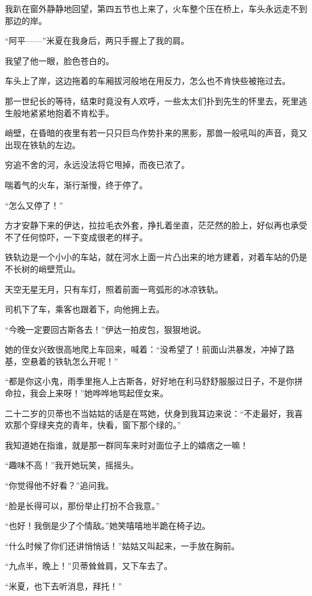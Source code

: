 \par 我趴在窗外静静地回望，第四五节也上来了，火车整个压在桥上，车头永远走不到那边的岸。
\par “阿平——”米夏在我身后，两只手握上了我的肩。
\par 我望了他一眼，脸色苍白的。
\par 车头上了岸，这边拖着的车厢拔河般地在用反力，怎么也不肯快些被拖过去。
\par 那一世纪长的等待，结束时竟没有人欢呼，一些太太们扑到先生的怀里去，死里逃生般地紧紧地抱着不肯松手。
\par 峭壁，在昏暗的夜里有若一只只巨鸟作势扑来的黑影，那兽一般吼叫的声音，竟又出现在铁轨的左边。
\par 穷追不舍的河，永远没法将它甩掉，而夜已浓了。
\par 喘着气的火车，渐行渐慢，终于停了。
\par “怎么又停了！”
\par 方才安静下来的伊达，拉拉毛衣外套，挣扎着坐直，茫茫然的脸上，好似再也承受不了任何惊吓，一下变成很老的样子。
\par 铁轨边是一个小小的车站，就在河水上面一片凸出来的地方建着，对着车站的仍是不长树的峭壁荒山。
\par 天空无星无月，只有车灯，照着前面一弯弧形的冰凉铁轨。
\par 司机下了车，乘客也跟着下，向他拥上去。
\par “今晚一定要回古斯各去！”伊达一拍皮包，狠狠地说。
\par 她的侄女兴致很高地爬上车回来，喊着：“没希望了！前面山洪暴发，冲掉了路基，空悬着的铁轨怎么开呢！”
\par “都是你这小鬼，雨季里拖人上古斯各，好好地在利马舒舒服服过日子，不是你拼命拉，我会上来呀！”她哗哗地骂起侄女来。
\par 二十二岁的贝蒂也不当姑姑的话是在骂她，伏身到我耳边来说：“不走最好，我喜欢那个穿绿夹克的青年，快看，窗下那个绿的。”
\par 我知道她在指谁，就是那一群同车来时对面位子上的嬉痞之一嘛！
\par “趣味不高！”我开她玩笑，摇摇头。
\par “你觉得他不好看？”追问我。
\par “脸是长得可以，那份举止打扮不合我意。”
\par “也好！我倒是少了个情敌。”她笑嘻嘻地半跪在椅子边。
\par “什么时候了你们还讲悄悄话！”姑姑又叫起来，一手放在胸前。
\par “九点半，晚上！”贝蒂耸耸肩，又下车去了。
\par “米夏，也下去听消息，拜托！”
